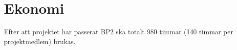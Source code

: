\section{Ekonomi}
Efter att projektet har passerat BP2 ska totalt 980 timmar (140 timmar per projektmedlem) brukas.